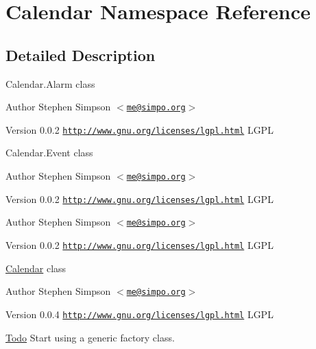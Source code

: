 \hypertarget{namespaceCalendar}{
\section{Calendar Namespace Reference}
\label{namespaceCalendar}
}


\subsection{Detailed Description}
Calendar.Alarm class

\begin{DoxyAuthor}{Author}
Stephen Simpson $<$\href{mailto:me@simpo.org}{\tt me@simpo.org}$>$ 
\end{DoxyAuthor}
\begin{DoxyVersion}{Version}
0.0.2  \href{http://www.gnu.org/licenses/lgpl.html}{\tt http://www.gnu.org/licenses/lgpl.html} LGPL
\end{DoxyVersion}
Calendar.Event class

\begin{DoxyAuthor}{Author}
Stephen Simpson $<$\href{mailto:me@simpo.org}{\tt me@simpo.org}$>$ 
\end{DoxyAuthor}
\begin{DoxyVersion}{Version}
0.0.2  \href{http://www.gnu.org/licenses/lgpl.html}{\tt http://www.gnu.org/licenses/lgpl.html} LGPL
\end{DoxyVersion}
\begin{DoxyAuthor}{Author}
Stephen Simpson $<$\href{mailto:me@simpo.org}{\tt me@simpo.org}$>$ 
\end{DoxyAuthor}
\begin{DoxyVersion}{Version}
0.0.2  \href{http://www.gnu.org/licenses/lgpl.html}{\tt http://www.gnu.org/licenses/lgpl.html} LGPL
\end{DoxyVersion}
\hyperlink{namespaceCalendar}{Calendar} class

\begin{DoxyAuthor}{Author}
Stephen Simpson $<$\href{mailto:me@simpo.org}{\tt me@simpo.org}$>$ 
\end{DoxyAuthor}
\begin{DoxyVersion}{Version}
0.0.4  \href{http://www.gnu.org/licenses/lgpl.html}{\tt http://www.gnu.org/licenses/lgpl.html} LGPL
\end{DoxyVersion}
\begin{Desc}
\item[\hyperlink{todo__todo000006}{Todo}]Start using a generic factory class. \end{Desc}


